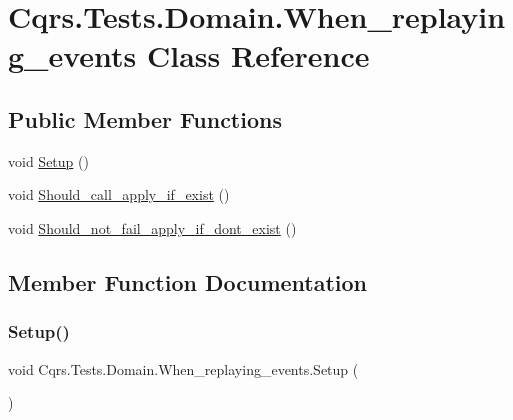 \hypertarget{classCqrs_1_1Tests_1_1Domain_1_1When__replaying__events}{}\section{Cqrs.\+Tests.\+Domain.\+When\+\_\+replaying\+\_\+events Class Reference}
\label{classCqrs_1_1Tests_1_1Domain_1_1When__replaying__events}
\subsection*{Public Member Functions}
\begin{DoxyCompactItemize}
\item 
void \hyperlink{classCqrs_1_1Tests_1_1Domain_1_1When__replaying__events_a83a76fd0ac92c405028a0a0d744d73a0}{Setup} ()
\item 
void \hyperlink{classCqrs_1_1Tests_1_1Domain_1_1When__replaying__events_a630778a73adf7e08123d354729d73e8e}{Should\+\_\+call\+\_\+apply\+\_\+if\+\_\+exist} ()
\item 
void \hyperlink{classCqrs_1_1Tests_1_1Domain_1_1When__replaying__events_a3709b0c411566da58817a0bdbb70099a}{Should\+\_\+not\+\_\+fail\+\_\+apply\+\_\+if\+\_\+dont\+\_\+exist} ()
\end{DoxyCompactItemize}


\subsection{Member Function Documentation}
\mbox{\label{classCqrs_1_1Tests_1_1Domain_1_1When__replaying__events_a83a76fd0ac92c405028a0a0d744d73a0}} 
\subsubsection{\texorpdfstring{Setup()}{Setup()}}
{\footnotesize\ttfamily void Cqrs.\+Tests.\+Domain.\+When\+\_\+replaying\+\_\+events.\+Setup (\begin{DoxyParamCaption}{ }\end{DoxyParamCaption})}

